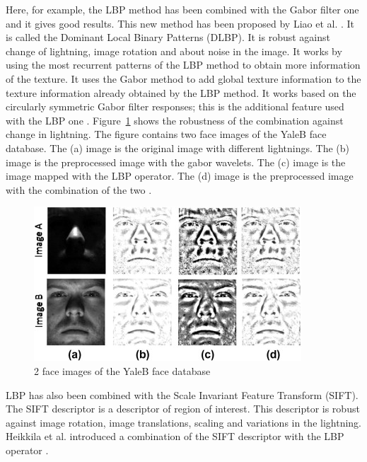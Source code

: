 \noindent  Here, for example, the LBP method has been combined with the Gabor filter one and it gives good results. This new method has been proposed by Liao et al. \cite{LIA09}. It is called the Dominant Local Binary Patterns (DLBP). It is robust against change of lightning, image rotation and about noise in the image.  It works by using the most recurrent patterns of the LBP method to obtain more information of the texture. It uses the Gabor method to add global texture information to the texture information already obtained by the LBP method. It works based on the circularly symmetric Gabor filter responses; this is the additional feature used with the LBP one \cite{LIA09}. Figure~\ref{combination_lbp_gabor} shows the robustness of the combination against change in lightning. The figure contains two face images of the YaleB face database. The (a) image is the original image with different lightnings. The (b) image is the preprocessed image with the gabor wavelets. The (c) image is the image mapped with the LBP operator. The (d) image is the preprocessed image with the combination of the two \cite{GOH11}.
\newline

\begin{figure}[!h]
\begin{center}
\noindent \includegraphics[scale=1]{figures/combination_lbp_gabor} 
\newline
\caption{2 face images of the YaleB face database \cite{GOH11}}
\label{combination_lbp_gabor}
\end{center} 
\end{figure}

\noindent  LBP has also been combined with the Scale Invariant Feature Transform (SIFT). The SIFT descriptor is a descriptor of region of interest. This descriptor is robust against image rotation, image translations, scaling and variations in the lightning. Heikkila et al. introduced a combination of the SIFT descriptor with the LBP operator \cite{HEI09}.
\newline
